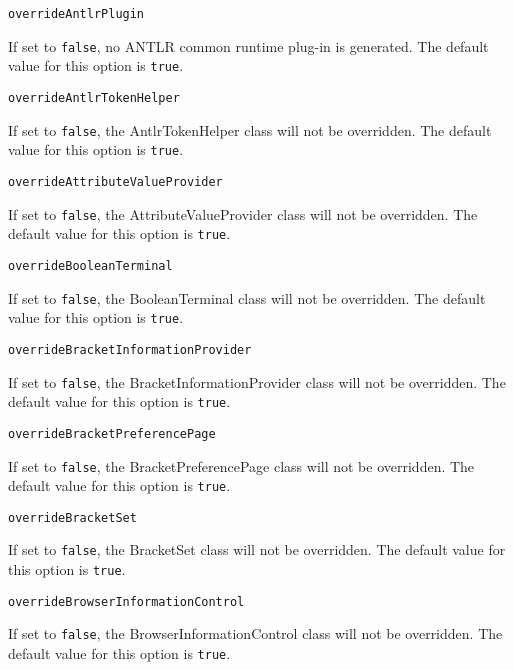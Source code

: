 \noindent\texttt{overrideAntlrPlugin}
\begin{myindentpar}{1cm}
If set to \texttt{false}, no ANTLR common runtime plug-in is generated. The default value for this option is \texttt{true}.
\end{myindentpar}

\noindent\texttt{overrideAntlrTokenHelper}
\begin{myindentpar}{1cm}
If set to \texttt{false}, the AntlrTokenHelper class will not be overridden. The default value for this option is \texttt{true}.
\end{myindentpar}

\noindent\texttt{overrideAttributeValueProvider}
\begin{myindentpar}{1cm}
If set to \texttt{false}, the AttributeValueProvider class will not be overridden. The default value for this option is \texttt{true}.
\end{myindentpar}

\noindent\texttt{overrideBooleanTerminal}
\begin{myindentpar}{1cm}
If set to \texttt{false}, the BooleanTerminal class will not be overridden. The default value for this option is \texttt{true}.
\end{myindentpar}

\noindent\texttt{overrideBracketInformationProvider}
\begin{myindentpar}{1cm}
If set to \texttt{false}, the BracketInformationProvider class will not be overridden. The default value for this option is \texttt{true}.
\end{myindentpar}

\noindent\texttt{overrideBracketPreferencePage}
\begin{myindentpar}{1cm}
If set to \texttt{false}, the BracketPreferencePage class will not be overridden. The default value for this option is \texttt{true}.
\end{myindentpar}

\noindent\texttt{overrideBracketSet}
\begin{myindentpar}{1cm}
If set to \texttt{false}, the BracketSet class will not be overridden. The default value for this option is \texttt{true}.
\end{myindentpar}

\noindent\texttt{overrideBrowserInformationControl}
\begin{myindentpar}{1cm}
If set to \texttt{false}, the BrowserInformationControl class will not be overridden. The default value for this option is \texttt{true}.
\end{myindentpar}

